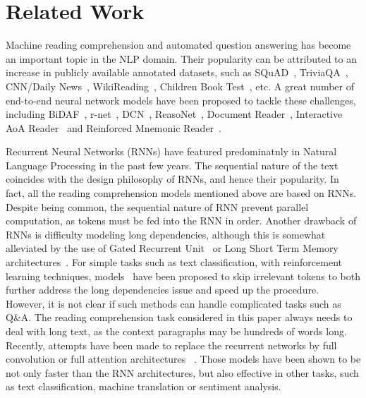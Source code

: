 \documentclass{article} \usepackage{iclr2018_conference,times}
\begin{document}
 \section{Related Work}\label{sec:rw}

 Machine reading comprehension and automated question answering has become an important topic in the NLP domain. Their popularity can be attributed to an increase in publicly available annotated datasets, such as SQuAD~\citep{RajpurkarZLL16}, TriviaQA~\citep{JoshiCWZ17}, CNN/Daily News~\citep{HermannKGEKSB15}, WikiReading~\citep{HewlettLJPFHKB16}, Children Book Test~\citep{HillBCW15}, etc. A great number of end-to-end neural network models have been proposed to tackle these challenges, including BiDAF~\citep{SeoKFH16}, r-net~\citep{WangYWCZ17}, DCN~\citep{XiongZS16}, ReasoNet~\citep{ShenHGC17}, Document Reader~\citep{ChenFWB17}, Interactive AoA Reader~\citep{CuiCWWLH17} and Reinforced Mnemonic Reader~\citep{HuPQ17}. 
 
Recurrent Neural Networks (RNNs) have featured predominatnly in Natural Language Processing in the past few years. 
The sequential nature of the text coincides with the design philosophy of RNNs, and hence their popularity. In fact, all the reading comprehension models mentioned above are based on RNNs.
Despite being common, the sequential nature of RNN prevent parallel computation, as tokens must be fed into the RNN in order. Another drawback of RNNs is difficulty modeling long dependencies, although this is somewhat alleviated by the use of Gated Recurrent Unit~\citep{chung2014empirical} or Long Short Term Memory architectures~\citep{hochreiter1997long}. For simple tasks such as text classification, with reinforcement learning techniques, models~\citep{YuLL17} have been proposed to skip irrelevant tokens to both further address the long dependencies issue and speed up the procedure. However, it is not clear if such methods can handle complicated tasks such as Q\&A.
The reading comprehension task considered in this paper always needs to deal with long text, as the context paragraphs may be hundreds of words long.
Recently, attempts have been made to replace the recurrent networks by 
full convolution or full attention architectures ~\citep{Kim14,gehring2017convolutional,vaswani2017attention,ShenZLJPZ17}. 
Those models have been shown to be not only faster than the RNN architectures, but also effective in other tasks, such as text classification, machine translation or sentiment analysis.
\end{document}
